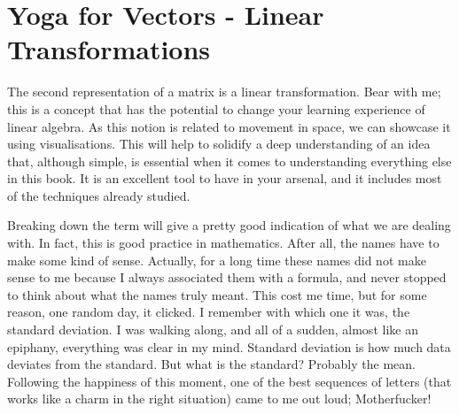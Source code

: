 \documentclass[600paper, 11pt,twoside,openany]{kdp}
\begin{document}
\section{Yoga for Vectors - Linear Transformations}
\indent The second representation of a matrix is a linear transformation. Bear with me; this is a concept that has the potential to change your learning experience of linear algebra. As this notion is related to movement in space, we can showcase it using visualisations. This will help to solidify a deep understanding of an idea that, although simple, is essential when it comes to understanding everything else in this book. It is an excellent tool to have in your arsenal, and it includes most of the techniques already studied. 
\par 
\indent Breaking down the term will give a pretty good indication of what we are dealing with. In fact, this is good practice in mathematics. After all, the names have to make some kind of sense. Actually, for a long time these names did not make sense to me because I always associated them with a formula, and never stopped to think about what the names truly meant. This cost me time, but for some reason, one random day, it clicked. I remember with which one it was, the standard deviation. I was walking along, and all of a sudden, almost like an epiphany, everything was clear in my mind. Standard deviation is how much data deviates from the standard. But what is the standard? Probably the mean. Following the happiness of this moment, one of the best sequences of letters (that works like a charm in the right situation) came to me out loud; Motherfucker! 
\end{document}
